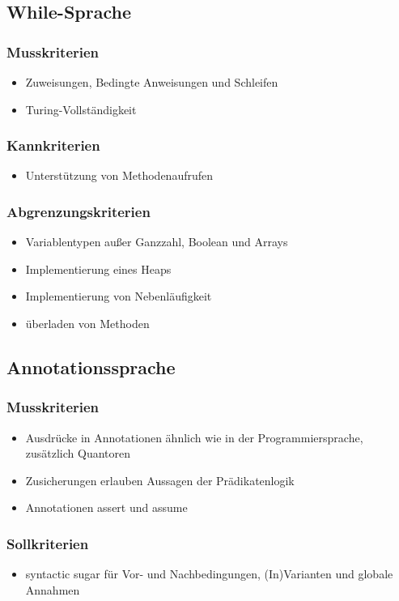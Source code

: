 \documentclass[a4paper,10pt]{article}
\begin{document}
\subsection{While-Sprache}
\subsubsection{Musskriterien}
\begin{itemize}
  \item Zuweisungen, Bedingte Anweisungen und Schleifen
  \item Turing-Vollst\"{a}ndigkeit
\end{itemize}
\subsubsection{Kannkriterien}
\begin{itemize}
  \item Unterst\"{u}tzung von Methodenaufrufen
\end{itemize}
\subsubsection{Abgrenzungskriterien}
\begin{itemize}
  \item Variablentypen außer Ganzzahl, Boolean und Arrays
  \item Implementierung eines Heaps
  \item Implementierung von Nebenl\"{a}ufigkeit
  \item \"{u}berladen von Methoden
\end{itemize}

\subsection{Annotationssprache}
\subsubsection{Musskriterien}
\begin{itemize}
  \item Ausdr\"{u}cke in Annotationen \"{a}hnlich wie in der Programmiersprache, zus\"{a}tzlich Quantoren
  \item Zusicherungen erlauben Aussagen der Pr\"{a}dikatenlogik
  \item Annotationen assert und assume
\end{itemize}
\subsubsection{Sollkriterien}
\begin{itemize}
  \item syntactic sugar f\"{u}r Vor- und Nachbedingungen, (In)Varianten und globale Annahmen
\end{itemize}
\end{document}
